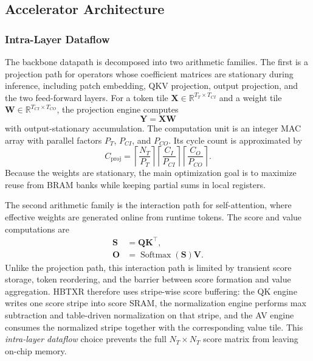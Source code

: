 \documentclass[journal]{IEEEtran}
\begin{document}
\subsection{Accelerator Architecture}

\subsubsection{Intra-Layer Dataflow}
The backbone datapath is decomposed into two arithmetic families. The first is a projection path for operators whose coefficient matrices are stationary during inference, including patch embedding, QKV projection, output projection, and the two feed-forward layers. For a token tile $\mathbf X\in\mathbb R^{T_T\times T_{CI}}$ and a weight tile $\mathbf W\in\mathbb R^{T_{CI}\times T_{CO}}$, the projection engine computes
\begin{equation}
\mathbf Y = \mathbf X\mathbf W
\end{equation}
with output-stationary accumulation. The computation unit is an integer MAC array with parallel factors $P_T$, $P_{CI}$, and $P_{CO}$. Its cycle count is approximated by
\begin{equation}
C_{\mathrm{proj}}=
\left\lceil\frac{N_T}{P_T}\right\rceil
\left\lceil\frac{C_I}{P_{CI}}\right\rceil
\left\lceil\frac{C_O}{P_{CO}}\right\rceil.
\end{equation}
Because the weights are stationary, the main optimization goal is to maximize reuse from BRAM banks while keeping partial sums in local registers.

The second arithmetic family is the interaction path for self-attention, where effective weights are generated online from runtime tokens. The score and value computations are
\begin{align}
\mathbf S &= \mathbf Q\mathbf K^\top,\\
\mathbf O &= \operatorname{Softmax}(\mathbf S)\mathbf V.
\end{align}
Unlike the projection path, this interaction path is limited by transient score storage, token reordering, and the barrier between score formation and value aggregation. HBTXR therefore uses stripe-wise score buffering: the QK engine writes one score stripe into score SRAM, the normalization engine performs max subtraction and table-driven normalization on that stripe, and the AV engine consumes the normalized stripe together with the corresponding value tile. This \emph{intra-layer dataflow} choice prevents the full $N_T\times N_T$ score matrix from leaving on-chip memory.
\end{document}
